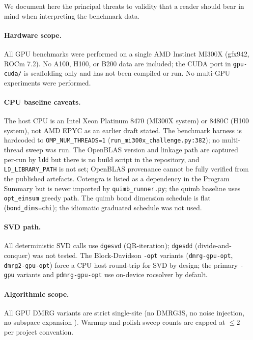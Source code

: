 \documentclass[preprint,12pt]{elsarticle}
\begin{document}
We document here the principal threats to validity that a reader should bear in mind when interpreting the benchmark data.

\paragraph{Hardware scope.}
All GPU benchmarks were performed on a single AMD Instinct MI300X (gfx942, ROCm 7.2).
No A100, H100, or B200 data are included; the CUDA port in \texttt{gpu-cuda/} is scaffolding only and has not been compiled or run.
No multi-GPU experiments were performed.

\paragraph{CPU baseline caveats.}
The host CPU is an Intel Xeon Platinum 8470 (MI300X system) or 8480C (H100 system), not AMD EPYC as an earlier draft stated.
The benchmark harness is hardcoded to \texttt{OMP\_NUM\_THREADS=1} (\texttt{run\_mi300x\_challenge.py:382}); no multi-thread sweep was run.
The OpenBLAS version and linkage path are captured per-run by \texttt{ldd} but there is no build script in the repository, and \texttt{LD\_LIBRARY\_PATH} is not set; OpenBLAS provenance cannot be fully verified from the published artefacts.
Cotengra is listed as a dependency in the Program Summary but is never imported by \texttt{quimb\_runner.py}; the quimb baseline uses \texttt{opt\_einsum} greedy path.
The quimb bond dimension schedule is flat (\texttt{bond\_dims=chi}); the idiomatic graduated schedule was not used.

\paragraph{SVD path.}
All deterministic SVD calls use \texttt{dgesvd} (QR-iteration); \texttt{dgesdd} (divide-and-conquer) was not tested.
The Block-Davidson \texttt{-opt} variants (\texttt{dmrg-gpu-opt}, \texttt{dmrg2-gpu-opt}) force a CPU host round-trip for SVD by design; the primary \texttt{-gpu} variants and \texttt{pdmrg-gpu-opt} use on-device rocsolver by default.

\paragraph{Algorithmic scope.}
All GPU DMRG variants are strict single-site (no DMRG3S, no noise injection, no subspace expansion \cite{Hubig2015}).
Warmup and polish sweep counts are capped at $\leq 2$ per project convention.
\end{document}
